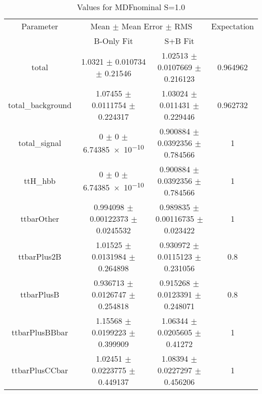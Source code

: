 \begin{table}
\centering
\caption{Values for MDFnominal S=1.0}
\begin{tabular}{cccc}
\toprule
Parameter & \multicolumn{2}{c}{Mean $\pm$ Mean Error $\pm$ RMS} & Expectation\\
 & B-Only Fit & S+B Fit & \\
\midrule
total & \num{1.0321} $\pm$ \num{0.010734} $\pm$ \num{0.21546} & \num{1.02513} $\pm$ \num{0.0107669} $\pm$ \num{0.216123} & \num{0.964962}\\
total\_background & \num{1.07455} $\pm$ \num{0.0111754} $\pm$ \num{0.224317} & \num{1.03024} $\pm$ \num{0.011431} $\pm$ \num{0.229446} & \num{0.962732}\\
total\_signal & \num{0} $\pm$ \num{0} $\pm$ \num{6.74385e-10} & \num{0.900884} $\pm$ \num{0.0392356} $\pm$ \num{0.784566} & \num{1}\\
ttH\_hbb & \num{0} $\pm$ \num{0} $\pm$ \num{6.74385e-10} & \num{0.900884} $\pm$ \num{0.0392356} $\pm$ \num{0.784566} & \num{1}\\
ttbarOther & \num{0.994098} $\pm$ \num{0.00122373} $\pm$ \num{0.0245532} & \num{0.989835} $\pm$ \num{0.00116735} $\pm$ \num{0.023422} & \num{1}\\
ttbarPlus2B & \num{1.01525} $\pm$ \num{0.0131984} $\pm$ \num{0.264898} & \num{0.930972} $\pm$ \num{0.0115123} $\pm$ \num{0.231056} & \num{0.8}\\
ttbarPlusB & \num{0.936713} $\pm$ \num{0.0126747} $\pm$ \num{0.254818} & \num{0.915268} $\pm$ \num{0.0123391} $\pm$ \num{0.248071} & \num{0.8}\\
ttbarPlusBBbar & \num{1.15568} $\pm$ \num{0.0199223} $\pm$ \num{0.399909} & \num{1.06344} $\pm$ \num{0.0205605} $\pm$ \num{0.41272} & \num{1}\\
ttbarPlusCCbar & \num{1.02451} $\pm$ \num{0.0223775} $\pm$ \num{0.449137} & \num{1.08394} $\pm$ \num{0.0227297} $\pm$ \num{0.456206} & \num{1}\\
\bottomrule
\end{tabular}
\end{table}